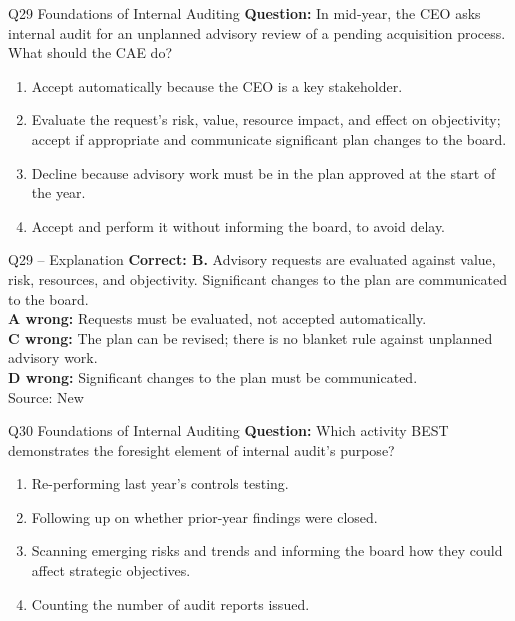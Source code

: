 \documentclass[aspectratio=169,10pt]{beamer}
\begin{document}
\begin{frame}[t]{Q29 \hfill {\scriptsize Foundations of Internal Auditing}}
	\small
	\textbf{Question:} In mid-year, the CEO asks internal audit for an unplanned advisory review of a pending acquisition process. What should the CAE do?
	\begin{enumerate}[label=\Alph*.,itemsep=1pt,topsep=3pt]
			\item Accept automatically because the CEO is a key stakeholder.
			\item Evaluate the request's risk, value, resource impact, and effect on objectivity; accept if appropriate and communicate significant plan changes to the board.
			\item Decline because advisory work must be in the plan approved at the start of the year.
			\item Accept and perform it without informing the board, to avoid delay.
	\end{enumerate}
\end{frame}

\begin{frame}[t]{Q29 -- Explanation}
	\footnotesize
	\textbf{Correct: B.} Advisory requests are evaluated against value, risk, resources, and objectivity. Significant changes to the plan are communicated to the board. \\[5pt]
\textbf{A wrong:} Requests must be evaluated, not accepted automatically. \\[3pt]
\textbf{C wrong:} The plan can be revised; there is no blanket rule against unplanned advisory work. \\[3pt]
\textbf{D wrong:} Significant changes to the plan must be communicated. \\[3pt]
	\vfill {\tiny Source: New}
\end{frame}

\begin{frame}[t]{Q30 \hfill {\scriptsize Foundations of Internal Auditing}}
	\small
	\textbf{Question:} Which activity BEST demonstrates the foresight element of internal audit's purpose?
	\begin{enumerate}[label=\Alph*.,itemsep=1pt,topsep=3pt]
			\item Re-performing last year's controls testing.
			\item Following up on whether prior-year findings were closed.
			\item Scanning emerging risks and trends and informing the board how they could affect strategic objectives.
			\item Counting the number of audit reports issued.
	\end{enumerate}
\end{frame}
\end{document}
